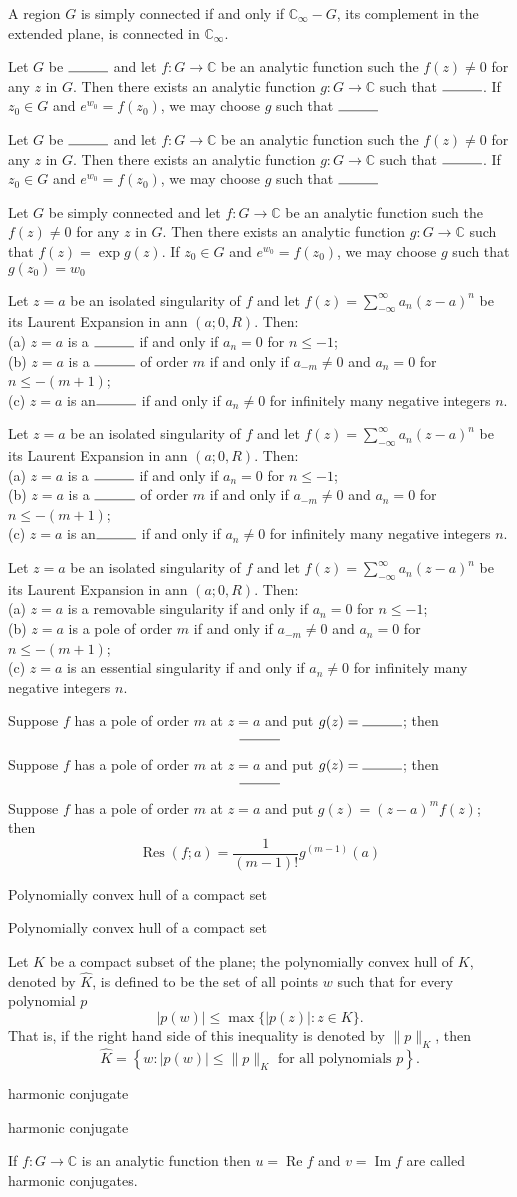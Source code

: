 \documentclass[17pt]{extarticle}
\newcommand{\boxset}[2]{\begin{mdframed}[style=darkQuesion]
#1
\end{mdframed}
\newpage
\begin{mdframed}[style=darkQuesion]
#1
  \end{mdframed}
\begin{mdframed}[style=darkAnswer]
#2
  \end{mdframed}
  \newpage
}
\begin{document}
{A region $G$ is simply connected if and only if $\mathbb{C}_{\infty}-G$, its complement in the extended plane, is connected in $\mathbb{C}_{\infty}$.}
\boxset{   Let $G$ be $\rule{1cm}{0.15mm}$ and let $f: G \rightarrow \mathbb{C}$ be an analytic function such the $f(z) \neq 0$ for any $z$ in $G$. Then there exists an analytic function $g: G \rightarrow \mathbb{C}$ such that $\rule{1cm}{0.15mm}$. If $z_{0} \in G$ and $e^{w_{0}}=f\left(z_{0}\right)$, we may choose $g$ such that $\rule{1cm}{0.15mm}$  }
{   Let $G$ be simply connected and let $f: G \rightarrow \mathbb{C}$ be an analytic function such the $f(z) \neq 0$ for any $z$ in $G$. Then there exists an analytic function $g: G \rightarrow \mathbb{C}$ such that $f(z)=\exp g(z)$. If $z_{0} \in G$ and $e^{w_{0}}=f\left(z_{0}\right)$, we may choose $g$ such that $g\left(z_{0}\right)=w_{0}$ }
\boxset{Let $z=a$ be an isolated singularity of $f$ and let $f(z)=\sum_{-\infty}^{\infty} a_{n}(z-a)^{n}$ be its Laurent Expansion in ann $(a ; 0, R)$. Then:\[\ \] (a) $z=a$ is a $\rule{1cm}{0.15mm}$ if and only if $a_{n}=0$ for $n \leq-1$;\[\ \] (b) $z=a$ is a $\rule{1cm}{0.15mm}$ of order $m$ if and only if $a_{-m} \neq 0$ and $a_{n}=0$ for $n \leq-(m+1)$;\[\ \] (c) $z=a$ is an$\rule{1cm}{0.15mm}$ if and only if $a_{n} \neq 0$ for infinitely many negative integers $n$. }
{Let $z=a$ be an isolated singularity of $f$ and let $f(z)=\sum_{-\infty}^{\infty} a_{n}(z-a)^{n}$ be its Laurent Expansion in ann $(a ; 0, R)$. Then:\[\ \] (a) $z=a$ is a removable singularity if and only if $a_{n}=0$ for $n \leq-1$;\[\ \] (b) $z=a$ is a pole of order $m$ if and only if $a_{-m} \neq 0$ and $a_{n}=0$ for $n \leq-(m+1)$;\[\ \] (c) $z=a$ is an essential singularity if and only if $a_{n} \neq 0$ for infinitely many negative integers $n$.}
\boxset{Suppose $f$ has a pole of order $m$ at $z=a$ and put $g(z)=\rule{1cm}{0.15mm}$; then \[\rule{1cm}{0.15mm}\] }
{   Suppose $f$ has a pole of order $m$ at $z=a$ and put $g(z)=(z-a)^{m} f(z)$; then \[\operatorname{Res}(f ; a)=\frac{1}{(m-1) !} g^{(m-1)}(a)\] }
\boxset{Polynomially convex hull of a compact set}
{Let $K$ be a compact subset of the plane; the polynomially convex hull of $K$, denoted by $\hat{K}$, is defined to be the set of all points $w$ such that for every polynomial $p$\[|p(w)| \leq \max \{|p(z)|: z \in K\} .\] That is, if the right hand side of this inequality is denoted by $\|p\|_{K}$, then \[\hat{K}=\left\{w:|p(w)| \leq\|p\|_{K} \text { for all polynomials } p\right\} .\]}
\boxset{harmonic conjugate}
{If $f: G \rightarrow \mathbb{C}$ is an analytic function then $u=\operatorname{Re} f$ and $v=\operatorname{Im} f$ are called harmonic conjugates.}
\end{document}
